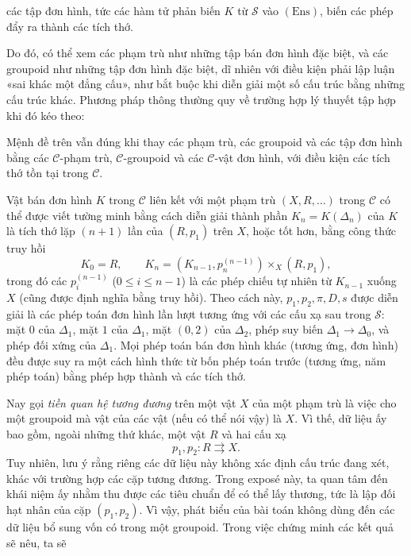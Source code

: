 các tập đơn hình, tức các hàm tử phản biến $K$ từ $\mathcal S$ vào
$(\mathrm{Ens})$, biến các phép đẩy ra thành các tích thớ.

Do đó, có thể xem các phạm trù như những tập bán đơn hình đặc biệt, và các
groupoid như những tập đơn hình đặc biệt, dĩ nhiên với điều kiện phải lập luận
«sai khác một đẳng cấu», như bắt buộc khi diễn giải một số cấu trúc bằng những
cấu trúc khác. Phương pháp thông thường quy về trường hợp lý thuyết tập hợp
khi đó kéo theo:

 Mệnh đề trên vẫn đúng khi thay các phạm trù, các
groupoid và các tập đơn hình bằng các $\mathcal C$-phạm trù,
$\mathcal C$-groupoid và các $\mathcal C$-vật đơn hình, với điều kiện các tích
thớ tồn tại trong $\mathcal C$.

Vật bán đơn hình $K$ trong $\mathcal C$ liên kết với một phạm trù
$(X,R,\ldots)$ trong $\mathcal C$ có thể được viết tường minh bằng cách diễn
giải thành phần $K_n=K(\Delta_n)$ của $K$ là tích thớ lặp $(n+1)$ lần của
$(R,p_1)$ trên $X$, hoặc tốt hơn, bằng công thức truy hồi
\[
  K_0=R,\qquad
  K_n=(K_{n-1},p_n^{(n-1)})\times_X(R,p_1),
\]
trong đó các $p_i^{(n-1)}$ ($0\leq i\leq n-1$) là các phép chiếu tự nhiên từ
$K_{n-1}$ xuống $X$ (cũng được định nghĩa bằng truy hồi). Theo cách này,
$p_1,p_2,\pi,D,s$ được diễn giải là các phép toán đơn hình lần lượt tương ứng
với các cấu xạ sau trong $\mathcal S$: mặt $0$ của $\Delta_1$, mặt $1$ của
$\Delta_1$, mặt $(0,2)$ của $\Delta_2$, phép suy biến
$\Delta_1\to\Delta_0$, và phép đối xứng của $\Delta_1$. Mọi phép toán bán đơn
hình khác (tương ứng, đơn hình) đều được suy ra một cách hình thức từ bốn
phép toán trước (tương ứng, năm phép toán) bằng phép hợp thành và các tích thớ.

Nay gọi \emph{tiền quan hệ tương đương} trên một vật $X$ của một phạm trù là
việc cho một groupoid mà vật của các vật (nếu có thể nói vậy) là $X$. Vì thế,
dữ liệu ấy bao gồm, ngoài những thứ khác, một vật $R$ và hai cấu xạ
\[
  p_1,p_2:R\rightrightarrows X.
\]
Tuy nhiên, lưu ý rằng riêng các dữ liệu này không xác định cấu trúc đang xét,
khác với trường hợp các cặp tương đương. Trong exposé này, ta quan tâm đến
khái niệm ấy nhằm thu được các tiêu chuẩn để có thể lấy thương, tức là lập đối
hạt nhân của cặp $(p_1,p_2)$. Vì vậy, phát biểu của bài toán không dùng đến
các dữ liệu bổ sung vốn có trong một groupoid. Trong việc chứng minh các kết
quả sẽ nêu, ta sẽ

